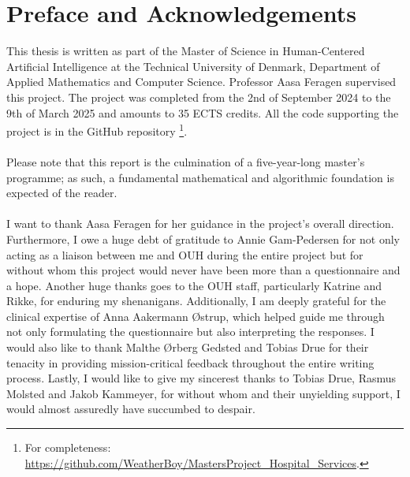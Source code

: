 \section*{Preface and Acknowledgements}
This thesis is written as part of the Master of Science in Human-Centered Artificial Intelligence at the Technical University of Denmark, Department of Applied Mathematics and Computer Science. Professor Aasa Feragen supervised this project. The project was completed from the 2nd of September 2024 to the 9th of March 2025 and amounts to 35 ECTS credits. All the code supporting the project is in the GitHub repository \footnote{For completeness: \href{https://github.com/WeatherBoy/MastersProject_Hospital_Services}{https://github.com/WeatherBoy/MastersProject\_Hospital\_Services}.}.
\\
\\
Please note that this report is the culmination of a five-year-long master's programme; as such, a fundamental mathematical and algorithmic foundation is expected of the reader.
\\
\\
I want to thank Aasa Feragen for her guidance in the project's overall direction. Furthermore, I owe a huge debt of gratitude to Annie Gam-Pedersen for not only acting as a liaison between me and OUH during the entire project but for without whom this project would never have been more than a questionnaire and a hope. Another huge thanks goes to the OUH staff, particularly Katrine and Rikke, for enduring my shenanigans. Additionally, I am deeply grateful for the clinical expertise of Anna Aakermann \O strup, which helped guide me through not only formulating the questionnaire but also interpreting the responses.
I would also like to thank Malthe \O rberg Gedsted and Tobias Drue for their tenacity in providing mission-critical feedback throughout the entire writing process.
Lastly, I would like to give my sincerest thanks to Tobias Drue, Rasmus Molsted and Jakob Kammeyer, for without whom and their unyielding support, I would almost assuredly have succumbed to despair.